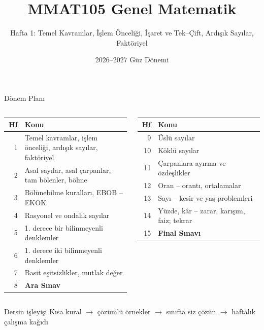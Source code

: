 \documentclass[aspectratio=169,11pt,handout]{beamer}
\title[MMAT105 -- Hafta 1]{MMAT105 Genel Matematik}
\subtitle{Hafta 1: Temel Kavramlar, İşlem Önceliği, İşaret ve Tek--Çift, Ardışık Sayılar, Faktöriyel}
\author{}
\date{2026--2027 Güz Dönemi}
\begin{document}
\begin{frame}
\titlepage
\end{frame}


\begin{frame}{Dönem Planı}
\scriptsize
\begin{columns}[t]
\begin{tabular}{@{}r p{0.86\linewidth}@{}}
\toprule
Hf & Konu\\\midrule
1 & Temel kavramlar, işlem önceliği, ardışık sayılar, faktöriyel\\
2 & Asal sayılar, asal çarpanlar, tam bölenler, bölme\\
3 & Bölünebilme kuralları, EBOB -- EKOK\\
4 & Rasyonel ve ondalık sayılar\\
5 & 1. derece bir bilinmeyenli denklemler\\
6 & 1. derece iki bilinmeyenli denklemler\\
7 & Basit eşitsizlikler, mutlak değer\\
8 & \textbf{Ara Sınav}\\\bottomrule
\end{tabular}
\begin{tabular}{@{}r p{0.86\linewidth}@{}}
\toprule
Hf & Konu\\\midrule
9 & Üslü sayılar\\
10 & Köklü sayılar\\
11 & Çarpanlara ayırma ve özdeşlikler\\
12 & Oran -- orantı, ortalamalar\\
13 & Sayı -- kesir ve yaş problemleri\\
14 & Yüzde, kâr -- zarar, karışım, faiz; tekrar\\
15 & \textbf{Final Sınavı}\\\bottomrule
\end{tabular}
\end{columns}
\vspace{6pt}
\begin{block}{Dersin işleyişi}
Kısa kural \(\rightarrow\) çözümlü örnekler \(\rightarrow\) sınıfta siz çözün \(\rightarrow\) haftalık çalışma kağıdı
\end{block}
\end{frame}
\end{document}
